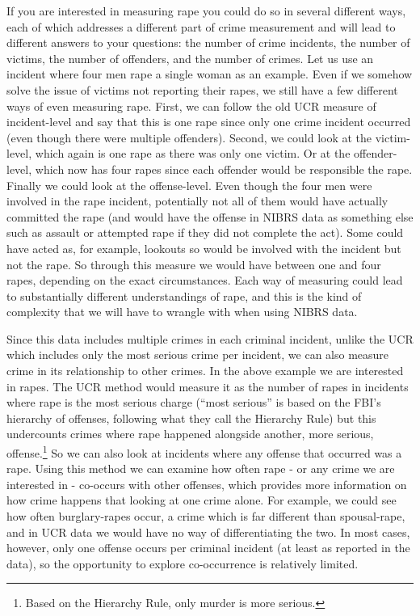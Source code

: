 \documentclass[
]{krantz}
\begin{document}
If you are interested in measuring rape you could do so in
several different ways, each of which addresses a different
part of crime measurement and will lead to different answers
to your questions: the number of crime incidents, the number
of victims, the number of offenders, and the number of
crimes. Let us use an incident where four men rape a single
woman as an example. Even if we somehow solve the issue of
victims not reporting their rapes, we still have a few
different ways of even measuring rape. First, we can follow
the old UCR measure of incident-level and say that this is
one rape since only one crime incident occurred (even though
there were multiple offenders). Second, we could look at the
victim-level, which again is one rape as there was only one
victim. Or at the offender-level, which now has four rapes
since each offender would be responsible the rape. Finally
we could look at the offense-level. Even though the four men
were involved in the rape incident, potentially not all of
them would have actually committed the rape (and would have
the offense in NIBRS data as something else such as assault
or attempted rape if they did not complete the act). Some
could have acted as, for example, lookouts so would be
involved with the incident but not the rape. So through this
measure we would have between one and four rapes, depending
on the exact circumstances. Each way of measuring could lead
to substantially different understandings of rape, and this
is the kind of complexity that we will have to wrangle with
when using NIBRS data.

Since this data includes multiple crimes in each criminal
incident, unlike the UCR which includes only the most
serious crime per incident, we can also measure crime in its
relationship to other crimes. In the above example we are
interested in rapes. The UCR method would measure it as the
number of rapes in incidents where rape is the most serious
charge (``most serious'' is based on the FBI's hierarchy of
offenses, following what they call the Hierarchy Rule) but
this undercounts crimes where rape happened alongside
another, more serious, offense.\footnote{Based on the
  Hierarchy Rule, only murder is more serious.} So we can
also look at incidents where any offense that occurred was a
rape. Using this method we can examine how often rape - or
any crime we are interested in - co-occurs with other
offenses, which provides more information on how crime
happens that looking at one crime alone. For example, we
could see how often burglary-rapes occur, a crime which is
far different than spousal-rape, and in UCR data we would
have no way of differentiating the two. In most cases,
however, only one offense occurs per criminal incident (at
least as reported in the data), so the opportunity to
explore co-occurrence is relatively limited.
\end{document}
